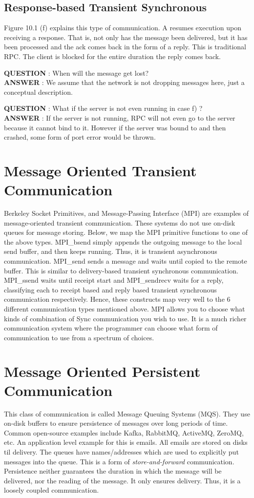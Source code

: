 \documentclass[twoside]{article}
\begin{document}
\subsection{Response-based Transient Synchronous}
Figure 10.1 (f) explains this type of communication. A resumes execution upon receiving a response. That is, not only has the message been delivered, but it has been processed and the ack comes back in the form of a reply. This is traditional RPC. The client is blocked for the entire duration the reply comes back.

\textbf{QUESTION} : When will the message get lost?\\
\textbf{ANSWER} : We assume that the network is not dropping messages here, just a conceptual description.

\textbf{QUESTION} : What if the server is not even running in case f) ? \\
\textbf{ANSWER} : If the server is not running, RPC will not even go to the server because it cannot bind to it. However if the server was bound to and then crashed, some form of port error would be thrown.

\section{Message Oriented Transient Communication}
Berkeley Socket Primitives, and Message-Passing Interface (MPI) are examples of message-oriented transient communication. These systems do not use on-disk queues for message storing. Below, we map the MPI primitive functions to one of the above types. MPI\_bsend simply appends the outgoing message to the local send buffer, and then keeps running. Thus, it is transient asynchronous communication. MPI\_send sends a message and waits until copied to the remote buffer. This is similar to delivery-based transient synchronous communication. MPI\_ssend waits until receipt start and MPI\_sendrecv waits for a reply, classifying each to receipt based and reply based transient synchronous communication respectively. Hence, these constructs map very well to the 6 different communication types mentioned above. MPI allows you to choose what kinds of combination of Sync communication you wish to use. It is a much richer communication system where the programmer can choose what form of communication to use from a spectrum of choices.


\section{Message Oriented Persistent Communication}
This class of communication is called Message Queuing Systems (MQS). They use on-disk buffers to ensure persistence of messages over long periods of time. Common open-source examples include Kafka, RabbitMQ, ActiveMQ, ZeroMQ, etc. An application level example for this is emails. All emails are stored on disks til delivery. The queues have names/addresses which are used to explicitly put messages into the queue. This is a form of \textit{store-and-forward} communication. Persistence neither guarantees the duration in which the message will be delivered, nor the reading of the message. It only ensures delivery. Thus, it is a loosely coupled communication. 
\end{document}
